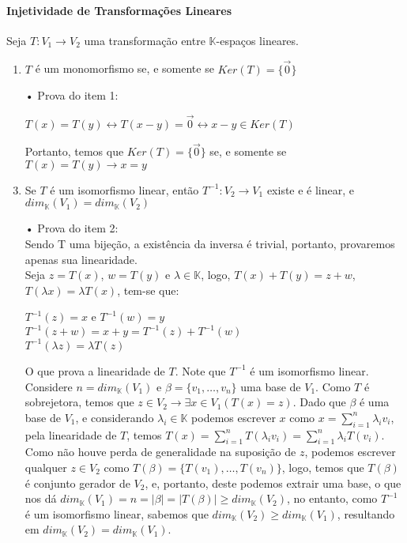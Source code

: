 \documentclass[12pt]{article}
\begin{document}
\paragraph{Injetividade de Transformações Lineares\\}
	Seja $T: V_1 \rightarrow V_2$ uma transformação entre $\mathbb{K}$-espaços lineares.
	\begin{enumerate}
		\item $T$ é um monomorfismo se, e somente se $Ker(T) = \lbrace \overrightarrow{0} \rbrace$
		\item[•] Prova do item 1:
			\begin{center}
				$T(x) = T(y) \leftrightarrow T(x-y) = \overrightarrow{0} \leftrightarrow x - y \in Ker(T)$
			\end{center}
			Portanto, temos que $Ker(T) = \lbrace \overrightarrow{0} \rbrace$ se, e somente se $T(x) = T(y) \rightarrow x = y$
		\item Se $T$ é um isomorfismo linear, então $T^{-1}: V_2 \rightarrow V_1$ existe e é linear, e $dim_{\mathbb{K}}(V_1) = dim_{\mathbb{K}}(V_2)$
		\item[•] Prova do item 2:\\
			Sendo T uma bijeção, a existência da inversa é trivial, portanto, provaremos apenas sua linearidade.\\
			Seja $z = T(x)$, $w = T(y)$ e $\lambda \in \mathbb{K}$, logo, $T(x) + T(y) = z + w$, $T(\lambda x) = \lambda T(x)$, tem-se que:
			\begin{center}		
				$T^{-1}(z) = x$ e $T^{-1}(w) = y$ \\[5pt]
				$T^{-1}(z + w) = x + y = T^{-1}(z) + T^{-1}(w)$ \\[5pt]
				$T^{-1}(\lambda z) = \lambda T(z)$
			\end{center}
			O que prova a linearidade de $T$. Note que $T^{-1}$ é um isomorfismo linear.\\[5pt]
			Considere $n = dim_\mathbb{K}(V_1)$ e $\beta = \lbrace v_1, \dots, v_n \rbrace$ uma base de $V_1$. Como $T$ é sobrejetora, temos que $z \in V_2 \rightarrow \exists x \in V_1 (T(x) = z)$. Dado que $\beta$ é uma base de $V_1$, e considerando $\lambda_i \in \mathbb{K}$ podemos escrever $x$ como $x = \sum\limits^n_{i=1}\lambda_iv_i$, pela linearidade de $T$, temos $T(x) = \sum\limits^n_{i=1} T(\lambda_i v_i)
= \sum\limits^n_{i=1} \lambda_i T(v_i)$. Como não houve perda de generalidade na suposição de $z$, podemos escrever qualquer $z \in V_2$ como $T(\beta) = \lbrace T(v_1), \dots, T(v_n) \rbrace$, logo, temos que $T(\beta)$ é conjunto gerador de $V_2$, e, portanto, deste podemos extrair uma base, o que nos dá $dim_\mathbb{K}(V_1) = n = \vert \beta \vert = \vert T(\beta) \vert \geq dim_\mathbb{K}(V_2)$, no entanto, como $T^{-1}$ é um isomorfismo linear, sabemos que $dim_\mathbb{K}(V_2) \geq dim_\mathbb{K}(V_1)$, resultando em  $dim_\mathbb{K}(V_2) = dim_\mathbb{K}(V_1)$.
	\end{enumerate}
	
\end{document}
